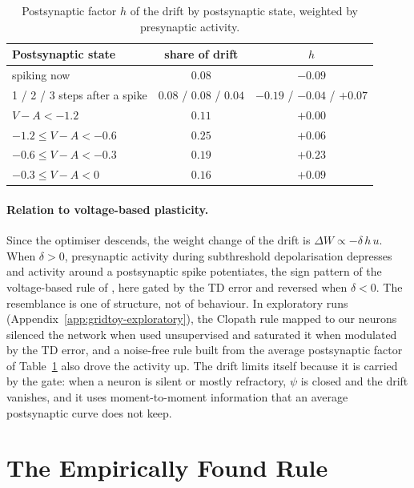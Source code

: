 \documentclass[10pt,twocolumn]{article}
\begin{document}
\begin{table}[h]
\centering\small
\caption{Postsynaptic factor $h$ of the drift by postsynaptic state, weighted by
presynaptic activity.}
\label{tab:hebb}
\begin{tabular}{lcc}
\toprule
Postsynaptic state & share of drift & $h$\\
\midrule
spiking now & $0.08$ & $-0.09$\\
1 / 2 / 3 steps after a spike & $0.08$ / $0.08$ / $0.04$ & $-0.19$ / $-0.04$ / $+0.07$\\
$V-A<-1.2$ & $0.11$ & $+0.00$\\
$-1.2\le V-A<-0.6$ & $0.25$ & $+0.06$\\
$-0.6\le V-A<-0.3$ & $0.19$ & $+0.23$\\
$-0.3\le V-A<0$ & $0.16$ & $+0.09$\\
\bottomrule
\end{tabular}
\end{table}

\paragraph{Relation to voltage-based plasticity.}
Since the optimiser descends, the weight change of the drift is
$\Delta W\propto-\delta\,h\,u$. When $\delta>0$, presynaptic activity during
subthreshold depolarisation depresses and activity around a postsynaptic spike
potentiates, the sign pattern of the voltage-based rule of
\citet{Clopath2010Voltage}, here gated by the TD error and reversed when
$\delta<0$. The resemblance is one of structure, not of behaviour. In exploratory
runs (Appendix~\ref{app:gridtoy-exploratory}), the Clopath rule mapped to our neurons
silenced the network when used unsupervised and saturated it when modulated by the
TD error, and a noise-free rule built from the average postsynaptic factor of
Table~\ref{tab:hebb} also drove the activity up. The drift limits itself because it
is carried by the gate: when a neuron is silent or mostly refractory, $\psi$ is closed
and the drift vanishes, and it uses moment-to-moment information that an average
postsynaptic curve does not keep.

\section{The Empirically Found Rule}
\label{app:original}
\end{document}
